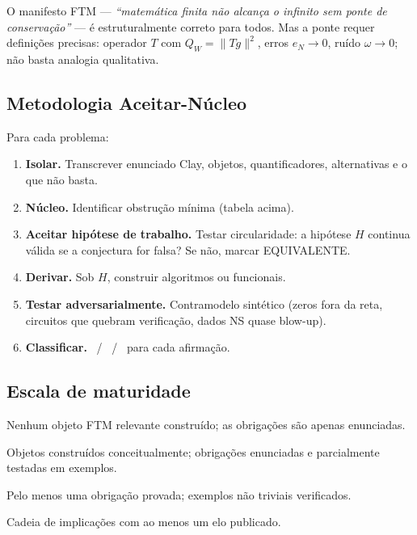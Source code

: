 \documentclass[11pt,a4paper]{article}
\begin{document}
O manifesto FTM — \emph{``matemática finita não alcança o infinito
sem ponte de conservação''} — é estruturalmente correto para todos.
Mas a ponte requer definições precisas:
operador $T$ com $Q_W=\|Tg\|^2$, erros $e_N\to0$, ruído $\omega\to0$;
não basta analogia qualitativa.

\subsection{Metodologia Aceitar-Núcleo}

Para cada problema:
\begin{enumerate}[leftmargin=2em]
\item \textbf{Isolar.} Transcrever enunciado Clay, objetos,
  quantificadores, alternativas e o que não basta.
\item \textbf{Núcleo.} Identificar obstrução mínima (tabela acima).
\item \textbf{Aceitar hipótese de trabalho.}
  Testar circularidade: a hipótese $H$ continua válida se a
  conjectura for falsa? Se não, marcar EQUIVALENTE.
\item \textbf{Derivar.} Sob $H$, construir algoritmos ou funcionais.
\item \textbf{Testar adversarialmente.}
  Contramodelo sintético (zeros fora da reta, circuitos que quebram
  verificação, dados NS quase blow-up).
\item \textbf{Classificar.}
  \PROVED\ / \CONDITIONAL\ / \OPEN\ para cada afirmação.
\end{enumerate}

\subsection{Escala de maturidade}

\begin{description}[leftmargin=4em,style=nextline]
\item[M0] Nenhum objeto FTM relevante construído;
  as obrigações são apenas enunciadas.
\item[M1] Objetos construídos conceitualmente;
  obrigações enunciadas e parcialmente testadas em exemplos.
\item[M2] Pelo menos uma obrigação provada;
  exemplos não triviais verificados.
\item[M3] Cadeia de implicações com ao menos um elo publicado.
\end{description}

\clearpage
\end{document}
